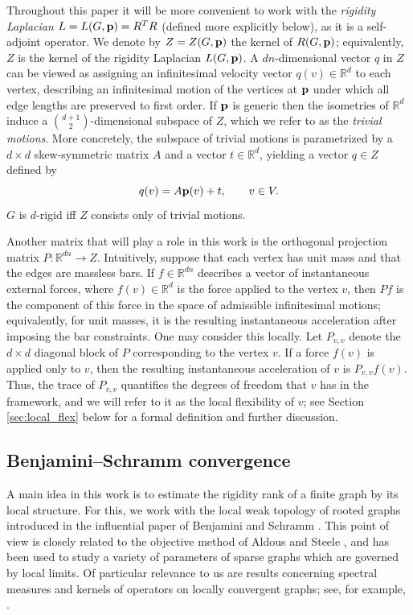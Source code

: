 \documentclass[10pt,a4paper]{amsart}
\numberwithin{equation}{section}
\newcommand{\R}{\mathbb R}
\newcommand{\p}{{\bf p}}
\begin{document}
Throughout this paper it will be more convenient to work with the {\em rigidity Laplacian} $L=L(G,\p)=R^TR$ (defined more explicitly below), as it is a self-adjoint operator.
We denote by $Z=Z(G,\p)$ the kernel of $R(G,\p)$; equivalently, $Z$ is the kernel of the rigidity Laplacian $L(G,\p)$. 
A \(dn\)-dimensional vector \(q\) in \(Z\) can be viewed as assigning an
infinitesimal velocity vector \(q(v)\in\R^d\) to each vertex, describing
an infinitesimal motion of the vertices at \(\p\) under which all edge
lengths are preserved to first order. If \(\p\) is generic then the
isometries of \(\R^d\) induce a \(\binom{d+1}{2}\)-dimensional subspace of
\(Z\), which we refer to as the {\em trivial motions}. More concretely, the
subspace of trivial motions is parametrized by a \(d\times d\)
skew-symmetric matrix \(A\) and a vector \(t\in\R^d\), yielding a vector
\(q\in Z\) defined by
\[
q(v)=A\p(v)+t,\qquad v\in V.
\]
$G$ is $d$-rigid iff $Z$ consists only of trivial motions. 

Another matrix that will play a role in this work is the orthogonal
projection matrix \(P:\R^{dn}\to Z\). Intuitively, suppose that each vertex
has unit mass and that the edges are massless bars. If \(f\in \R^{dn}\) describes a vector of instantaneous external forces,
where \(f(v)\in\R^d\) is the force applied to the vertex \(v\), then
\(Pf\) is the component of this force in the space of admissible
infinitesimal motions; equivalently, for unit masses, it is the resulting
instantaneous acceleration after imposing the bar constraints.
One may consider this locally. Let \(P_{v,v}\) denote the
\(d\times d\) diagonal block of \(P\) corresponding to the vertex \(v\).
If a force \(f(v)\) is applied only to \(v\), then the resulting
instantaneous acceleration of \(v\) is
$P_{v,v} f(v).$ Thus, the trace of $P_{v,v}$ quantifies the degrees of freedom that $v$ has in the framework, and we will refer to it as the local flexibility of $v$; see Section \ref{sec:local_flex} below for a formal definition and further discussion.

\subsection{Benjamini--Schramm convergence}
A main idea in this work is to estimate the rigidity rank of a finite graph by its local structure. 
For this, we work with the local weak topology of rooted graphs introduced in the influential paper 
of Benjamini and Schramm \cite{BenjaminiSchramm2001}. 
This point of view is closely related to the objective method of Aldous and Steele
\cite{AldousSteeleObjectiveMethod}, and has been used to study a variety of
parameters of sparse graphs which are governed by local limits. Of particular
relevance to us are results concerning spectral measures and kernels of
operators on locally convergent graphs; see, for example,
\cite{AbertThomViragSpectralMeasure,BordenaveLelarge2010,BordenaveLelargeSalezDiluted}.
\end{document}
